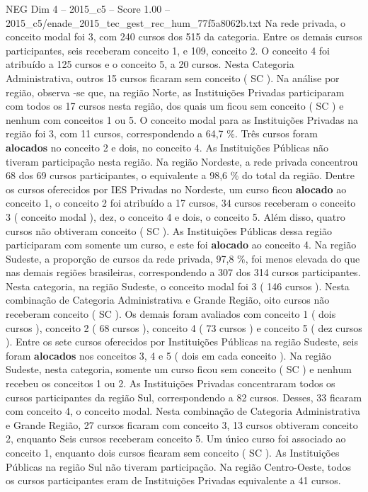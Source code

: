 \begin{textsample}{NEG Dim 4 – 2015\_c5 – Score 1.00 – 2015\_c5/enade\_2015\_tec\_gest\_rec\_hum\_77f5a8062b.txt}
Na rede privada, o conceito modal foi 3, com 240 cursos dos 515 da categoria.
Entre os demais cursos participantes, seis receberam conceito 1, e 109, conceito 2.
O conceito 4 foi atribuído a 125 cursos e o conceito 5, a 20 cursos.
Nesta Categoria Administrativa, outros 15 cursos ficaram sem conceito ( SC ).
Na análise por região, observa -se que, na região Norte, as Instituições Privadas participaram com todos os 17 cursos nesta região, dos quais um ficou sem conceito ( SC ) e nenhum com conceitos 1 ou 5.
O conceito modal para as Instituições Privadas na região foi 3, com 11 cursos, correspondendo a 64,7 \%.
Três cursos foram \textbf{alocados} no conceito 2 e dois, no conceito 4.
As Instituições Públicas não tiveram participação nesta região.
Na região Nordeste, a rede privada concentrou 68 dos 69 cursos participantes, o equivalente a 98,6 \% do total da região.
Dentre os cursos oferecidos por IES Privadas no Nordeste, um curso ficou \textbf{alocado} ao conceito 1, o conceito 2 foi atribuído a 17 cursos, 34 cursos receberam o conceito 3 ( conceito modal ), dez, o conceito 4 e dois, o conceito 5.
Além disso, quatro cursos não obtiveram conceito ( SC ).
As Instituições Públicas dessa região participaram com somente um curso, e este foi \textbf{alocado} ao conceito 4.
Na região Sudeste, a proporção de cursos da rede privada, 97,8 \%, foi menos elevada do que nas demais regiões brasileiras, correspondendo a 307 dos 314 cursos participantes.
Nesta categoria, na região Sudeste, o conceito modal foi 3 ( 146 cursos ).
Nesta combinação de Categoria Administrativa e Grande Região, oito cursos não receberam conceito ( SC ).
Os demais foram avaliados com conceito 1 ( dois cursos ), conceito 2 ( 68 cursos ), conceito 4 ( 73 cursos ) e conceito 5 ( dez cursos ).
Entre os sete cursos oferecidos por Instituições Públicas na região Sudeste, seis foram \textbf{alocados} nos conceitos 3, 4 e 5 ( dois em cada conceito ).
Na região Sudeste, nesta categoria, somente um curso ficou sem conceito ( SC ) e nenhum recebeu os conceitos 1 ou 2.
As Instituições Privadas concentraram todos os cursos participantes da região Sul, correspondendo a 82 cursos.
Desses, 33 ficaram com conceito 4, o conceito modal.
Nesta combinação de Categoria Administrativa e Grande Região, 27 cursos ficaram com conceito 3, 13 cursos obtiveram conceito 2, enquanto Seis cursos receberam conceito 5.
Um único curso foi associado ao conceito 1, enquanto dois cursos ficaram sem conceito ( SC ).
As Instituições Públicas na região Sul não tiveram participação.
Na região Centro-Oeste, todos os cursos participantes eram de Instituições Privadas equivalente a 41 cursos.

\end{textsample}
